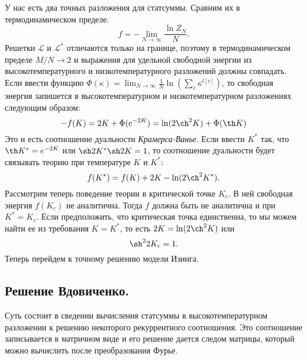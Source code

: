 \documentclass[a4paper,12pt]{article}
\theoremstyle{definition}
\theoremstyle{definition}
\theoremstyle{definition}
\begin{document}
У нас есть два точных разложения для статсуммы. Сравним их в термодинамическом пределе.
\begin{equation}
  \label{eq:109}
  f=-\lim_{N\to \infty}\frac{\ln Z_N}{N}.
\end{equation}
Решетки $\mathcal{L}$ и $\mathcal{L}^*$ отличаются только на границе, поэтому в термодинамическом
пределе $M/N\to 2$ и выражения для удельной свободной энергии из высокотемпературного и
низкотемпературного разложений должны совпадать. Если ввести функцию $\Phi(\kappa)=\lim_{N\to
  \infty}\frac{1}{N} \ln \left(\sum_c \kappa^{l[c]}\right)$, то свободная энергия запишется в
высокотемпературном и низкотемпературном разложениях следующим образом: 
\begin{equation}
  \label{eq:110}
  -f(K)=2K+\Phi(e^{-2K})=\ln(2\ch^2 K)+\Phi(\th K)
\end{equation}
Это и есть соотношение дуальности {\it Крамерса-Ванье}. Если ввести $K^*$ так, что $\th K^*=e^{-2K}$
или $\sh 2K^* \sh 2K=1$, то соотношение дуальности будет связывать теорию при температуре $K$ и
$K^*$: 
\begin{equation}
  \label{eq:111}
  f(K^*)=f(K)+2K-\ln(2\ch^2 K^*).
\end{equation}
Рассмотрим теперь поведение теории в критической точке $K_c$. В ней свободная энергия $f(K_c)$ не
аналитична. Тогда $f$ должна быть не аналитична и при $K^*=K_c$. Если предположить, что критическая
точка единственна, то мы можем найти ее из требования $K=K^*$, то есть $2K=\ln(2\ch^2 K)$ или 
\begin{equation}
  \label{eq:112}
  \sh^2 2K_c=1.
\end{equation}
Теперь перейдем к точному решению модели Изинга.

\subsection{Решение Вдовиченко.}
\label{sec:lecture-6}
Суть состоит в сведении вычисления статсуммы в высокотемпературном разложении к решению некоторого
рекуррентного соотношения. Это соотношение записывается в матричном виде и его решение дается следом
матрицы, который можно вычислить после преобразования Фурье. 
\end{document}
